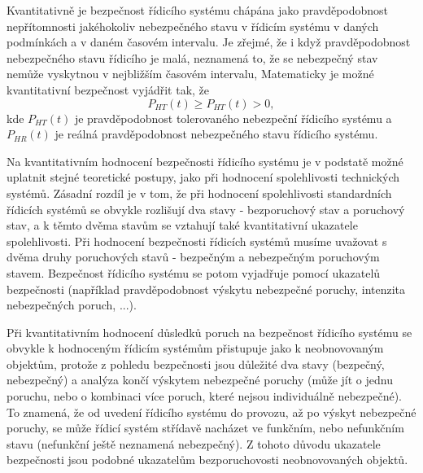     Kvantitativně je bezpečnost řídicího systému chápána jako pravděpodobnost nepřítomnosti
    jakéhokoliv nebezpečného stavu v řídicím systému v daných podmínkách a v daném časovém intervalu. Je zřejmé, že i když pravděpodobnost nebezpečného stavu řídicího je malá, neznamená to, že se nebezpečný stav nemůže vyskytnou v nejbližším časovém intervalu, Matematicky je možné
    kvantitativní bezpečnost vyjádřit tak, že 
    \begin{equation}
      P_{HT}(t)\geq P_{HT}(t)>0,
    \end{equation}
    kde \(P_{HT}(t)\) je pravděpodobnost tolerovaného nebezpeční řídicího systému a \(P_{HR}(t)\) je reálná pravděpodobnost nebezpečného stavu řídicího systému.   
	
    Na kvantitativním hodnocení bezpečnosti řídicího systému je v podstatě možné uplatnit stejné 
    teoretické postupy, jako při hodnocení spolehlivosti technických systémů. Zásadní rozdíl je v tom, že při hodnocení spolehlivosti standardních řídicích systémů se obvykle rozlišují dva stavy - bezporuchový stav a poruchový stav, a k těmto dvěma stavům se vztahují také kvantitativní ukazatele spolehlivosti. Při hodnocení bezpečnosti řídicích systémů musíme uvažovat s dvěma druhy poruchových stavů - bezpečným a nebezpečným poruchovým stavem. Bezpečnost řídicího systému se potom vyjadřuje pomocí ukazatelů bezpečnosti (například pravděpodobnost výskytu nebezpečné poruchy, intenzita nebezpečných poruch, ...).

    Při kvantitativním hodnocení důsledků poruch na bezpečnost řídicího systému se obvykle k
    hodnoceným řídicím systémům přistupuje jako k neobnovovaným objektům, protože z pohledu
    bezpečnosti jsou důležité dva stavy (bezpečný, nebezpečný) a analýza končí výskytem nebezpečné
    poruchy (může jít o jednu poruchu, nebo o kombinaci více poruch, které nejsou individuálně
    nebezpečné). To znamená, že od uvedení řídicího systému do provozu, až po výskyt nebezpečné
    poruchy, se může řídicí systém střídavě nacházet ve funkčním, nebo nefunkčním stavu (nefunkční
    ještě neznamená nebezpečný). Z tohoto důvodu ukazatele bezpečnosti jsou podobné ukazatelům
    bezporuchovosti neobnovovaných objektů. 
  
